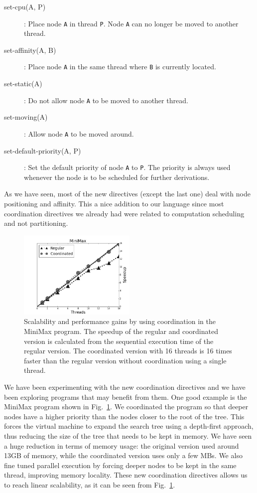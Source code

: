 \documentclass[10pt]{article}
\begin{document}
\begin{description}
   \item[set-cpu(A, P)]: Place node \texttt{A} in thread \texttt{P}. Node
   \texttt{A} can no longer be moved to another thread.
   \item[set-affinity(A, B)]: Place node \texttt{A} in the same thread where
   \texttt{B} is currently located.
   \item[set-static(A)]: Do not allow node \texttt{A} to be moved to another
   thread.
   \item[set-moving(A)]: Allow node \texttt{A} to be moved around.
   \item[set-default-priority(A, P)]: Set the default priority of node
   \texttt{A} to \texttt{P}. The priority is always used whenever the node is to
   be scheduled for further derivations.
\end{description}

As we have seen, most of the new directives (except the last one) deal with node
positioning and affinity. This a nice addition to our language since most
coordination directives we already had were related to computation scheduling
and not partitioning.

\begin{figure}
  \begin{center}
   \includegraphics[width=0.5\textwidth]{figures/coord_min-max-tictactoe}
\end{center}
\caption{Scalability and performance gains by using coordination in the MiniMax
   program. The speedup of the regular and coordinated version is calculated
   from the sequential execution time of the regular version. The coordinated
   version with 16 threads is 16 times faster than the regular version without
   coordination using a single thread.}
\label{fig:coord}
\end{figure}

We have been experimenting with the new coordination directives and we have been
exploring programs that may benefit from them. One good example is the MiniMax
program shown in Fig.~\ref{fig:coord}. We coordinated the program so that deeper
nodes have a higher priority than the nodes closer to the root of the tree. This
forces the virtual machine to expand the search tree using a depth-first
approach, thus reducing the size of the tree that needs to be kept in memory. We
have seen a huge reduction in terms of memory usage: the original version used
around 13GB of memory, while the coordinated version uses only a few MBs. We
also fine tuned parallel execution by forcing deeper nodes to be kept in the
same thread, improving memory locality. These new coordination directives allows
us to reach linear scalability, as it can be seen from Fig.~\ref{fig:coord}.
\end{document}
